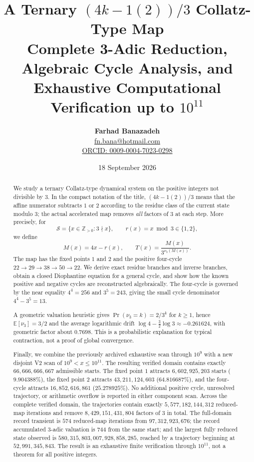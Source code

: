 \documentclass[11pt]{article}
\title{\textbf{A Ternary $(4k-1(2))/3$ Collatz-Type Map}\\[4pt]
\large Complete 3-Adic Reduction, Algebraic Cycle Analysis, and Exhaustive Computational Verification up to $10^{11}$}
\author{\textbf{Farhad Banazadeh}\\
\href{mailto:fn.bana@hotmail.com}{fn.bana@hotmail.com}\\
\href{https://orcid.org/0009-0004-7023-0298}{ORCID: 0009-0004-7023-0298}}
\date{18 September 2026}
\newcommand{\vthree}{\nu_3}
\newcommand{\Sset}{\mathcal S}
\newcommand{\Tmap}{T}
\newcommand{\Mmap}{M}
\begin{document}
\maketitle

\begin{abstract}\sloppy
We study a ternary Collatz-type dynamical system on the positive integers not divisible by $3$.  In the compact notation of the title, $(4k-1(2))/3$ means that the affine numerator subtracts $1$ or $2$ according to the residue class of the current state modulo $3$; the actual accelerated map removes \emph{all} factors of $3$ at each step.  More precisely, for
\[
\Sset=\{x\in\mathbb Z_{>0}:3\nmid x\},\qquad r(x)=x\bmod 3\in\{1,2\},
\]
we define
\[
\Mmap(x)=4x-r(x),\qquad
\Tmap(x)=\frac{\Mmap(x)}{3^{\vthree(\Mmap(x))}}.
\]
The map has the fixed points $1$ and $2$ and the positive four-cycle
$22\to29\to38\to50\to22$.  We derive exact residue branches and inverse branches, obtain a closed Diophantine equation for a general cycle, and show how the known positive and negative cycles are reconstructed algebraically.  The four-cycle is governed by the near equality $4^4=256$ and $3^5=243$, giving the small cycle denominator $4^4-3^5=13$.

A geometric valuation heuristic gives
$\Pr(\vthree=k)=2/3^k$ for $k\ge1$, hence
$\mathbb E[\vthree]=3/2$ and the average logarithmic drift
$\log 4-\frac32\log 3\approx-0.261624$, with geometric factor about $0.7698$.  This is a probabilistic explanation for typical contraction, not a proof of global convergence.

Finally, we combine the previously archived exhaustive scan through $10^9$ with a new disjoint V2 scan of $10^9<x\le10^{11}$.  The resulting verified domain contains exactly $66,666,666,667$ admissible starts.  The fixed point $1$ attracts $6,602,925,203$ starts ($9.904388\%$), the fixed point $2$ attracts $43,211,124,603$ ($64.816687\%$), and the four-cycle attracts $16,852,616,861$ ($25.278925\%$).  No additional positive cycle, unresolved trajectory, or arithmetic overflow is reported in either component scan.  Across the complete verified domain, the trajectories contain exactly $5,577,182,144,312$ reduced-map iterations and remove $8,429,151,431,804$ factors of $3$ in total.  The full-domain record transient is $574$ reduced-map iterations from $97,312,923,676$; the record accumulated $3$-adic valuation is $744$ from the same start; and the largest fully reduced state observed is $580,315,803,007,928,858,285$, reached by a trajectory beginning at $52,991,345,843$.  The result is an exhaustive finite verification through $10^{11}$, not a theorem for all positive integers.
\end{abstract}
\end{document}
